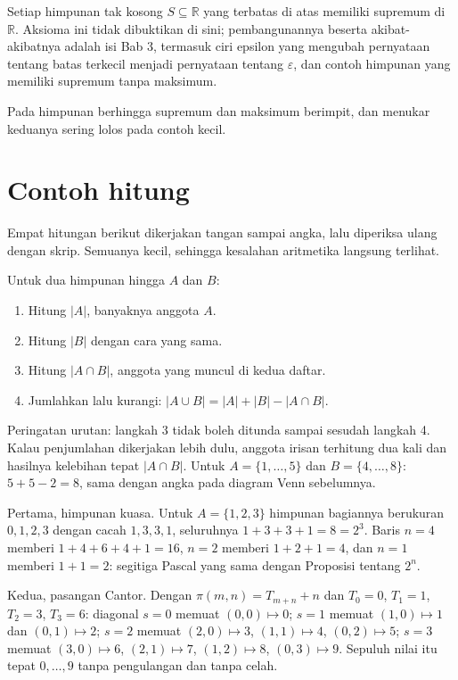 \begin{catatan}
Setiap himpunan tak kosong $S \subseteq \mathbb{R}$ yang terbatas di atas memiliki
supremum di $\mathbb{R}$. Aksioma ini tidak dibuktikan di sini; pembangunannya
beserta akibat-akibatnya adalah isi Bab 3, termasuk ciri epsilon yang mengubah
pernyataan tentang batas terkecil menjadi pernyataan tentang $\varepsilon$, dan
contoh himpunan yang memiliki supremum tanpa maksimum.
\end{catatan}

Pada himpunan berhingga supremum dan maksimum berimpit, dan menukar keduanya sering
lolos pada contoh kecil.

\section{Contoh hitung}

Empat hitungan berikut dikerjakan tangan sampai angka, lalu diperiksa ulang dengan
skrip. Semuanya kecil, sehingga kesalahan aritmetika langsung terlihat.

\begin{resep}
Untuk dua himpunan hingga $A$ dan $B$:
\begin{enumerate}
  \item Hitung $|A|$, banyaknya anggota $A$.
  \item Hitung $|B|$ dengan cara yang sama.
  \item Hitung $|A \cap B|$, anggota yang muncul di kedua daftar.
  \item Jumlahkan lalu kurangi: $|A \cup B| = |A| + |B| - |A \cap B|$.
\end{enumerate}
Peringatan urutan: langkah 3 tidak boleh ditunda sampai sesudah langkah 4. Kalau
penjumlahan dikerjakan lebih dulu, anggota irisan terhitung dua kali dan hasilnya
kelebihan tepat $|A \cap B|$. Untuk $A = \{1,\dots,5\}$ dan $B = \{4,\dots,8\}$:
$5 + 5 - 2 = 8$, sama dengan angka pada diagram Venn sebelumnya.
\end{resep}

Pertama, himpunan kuasa. Untuk $A = \{1,2,3\}$ himpunan bagiannya berukuran
$0,1,2,3$ dengan cacah $1, 3, 3, 1$, seluruhnya $1 + 3 + 3 + 1 = 8 = 2^{3}$. Baris
$n = 4$ memberi $1+4+6+4+1 = 16$, $n = 2$ memberi $1+2+1 = 4$, dan $n = 1$ memberi
$1+1 = 2$: segitiga Pascal yang sama dengan Proposisi tentang $2^{n}$.

Kedua, pasangan Cantor. Dengan $\pi(m,n) = T_{m+n} + n$ dan $T_0 = 0$, $T_1 = 1$,
$T_2 = 3$, $T_3 = 6$: diagonal $s = 0$ memuat $(0,0) \mapsto 0$; $s = 1$ memuat
$(1,0) \mapsto 1$ dan $(0,1) \mapsto 2$; $s = 2$ memuat $(2,0) \mapsto 3$,
$(1,1) \mapsto 4$, $(0,2) \mapsto 5$; $s = 3$ memuat $(3,0) \mapsto 6$,
$(2,1) \mapsto 7$, $(1,2) \mapsto 8$, $(0,3) \mapsto 9$. Sepuluh nilai itu tepat
$0, \dots, 9$ tanpa pengulangan dan tanpa celah.

